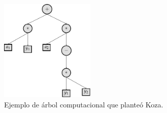 \begin{center}

    \begin{figure}[h]
        \centering
        \includegraphics[width=0.4\textwidth]{"figures/koza_tree_example.pdf"}
        \caption{Ejemplo de árbol computacional que planteó Koza.}
        \label{tikzpicture:koza_tree_example}
    \end{figure}
\end{center}

